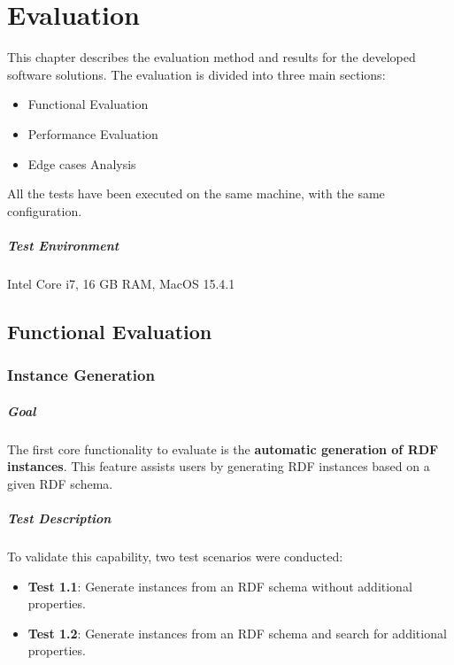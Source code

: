 \chapter{Evaluation\label{cha:chapter5}}

This chapter describes the evaluation method and results for the developed software solutions. 
The evaluation is divided into three main sections: 
\begin{itemize}
    \item Functional Evaluation
    \item Performance Evaluation
    \item Edge cases Analysis
\end{itemize}

All the tests have been executed on the same machine, with the same configuration. \paragraph{Test Environment} Intel Core i7, 16 GB RAM, MacOS 15.4.1 

    


\section{Functional Evaluation}

\subsection{Instance Generation}

\paragraph{Goal}
The first core functionality to evaluate is the \textbf{automatic generation of RDF instances}. This feature assists users by generating RDF instances based on a given RDF schema.

\paragraph{Test Description}
To validate this capability, two test scenarios were conducted:
\begin{itemize}
    \item \textbf{Test 1.1}: Generate instances from an RDF schema without additional properties.
    \item \textbf{Test 1.2}: Generate instances from an RDF schema and search for additional properties.
\end{itemize}

